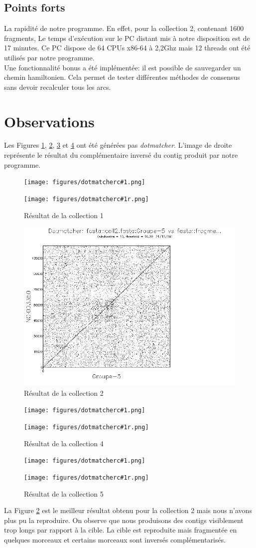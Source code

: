 \documentclass[a4paper, 12pt, titlepage]{article}
\begin{document}
\subsection*{Points forts}
La rapidité de notre programme. En effet, pour la collection 2, contenant 1600 fragments,
Le temps d'exécution sur le PC distant mis à notre disposition est de 17 minutes.
Ce PC dispose de 64 CPUs x86-64 à 2,2Ghz mais 12 threads ont été utilisés par notre programme.\\

Une fonctionnalité bonus a été implémentée: il est possible de sauvegarder un chemin hamiltonien.
Cela permet de tester différentes méthodes de consensus sans devoir recalculer tous les arcs.

\newcommand{\dmscale}{0.6}
\newcommand{\incl}[2]{
\begin{figure}
 \begin{minipage}[c]{.47\linewidth}
  \texttt{[image: figures/dotmatcherc\#1.png]}
 \end{minipage}
 \begin{minipage}[c]{.47\linewidth}
  \texttt{[image: figures/dotmatcherc\#1r.png]}
 \end{minipage} 
 \caption{Résultat de la collection #1}
 \label{dm#1}
\end{figure}
}
\section{Observations}
Les Figures \ref{dm1}, \ref{dm2}, \ref{dm4} et \ref{dm5} ont été générées pas \emph{dotmatcher}.
L'image de droite représente le résultat du complémentaire inversé du contig produit par notre programme.\\
\incl{1}{\dmscale}
\begin{figure}
 \centering
 \includegraphics[scale=0.4]{figures/dotmatcherc2.png}
 \caption{Résultat de la collection 2}
 \label{dm2}
\end{figure}
\incl{4}{\dmscale}
\incl{5}{\dmscale}
La Figure \ref{dm2} est le meilleur résultat obtenu pour la collection 2 mais nous n'avons plus pu la reproduire.
On observe que nous produisons des contigs visiblement trop longs par rapport à la cible.
La cible est reproduite mais fragmentée en quelques morceaux et certains morceaux sont inversés complémentarisés.
\end{document}

